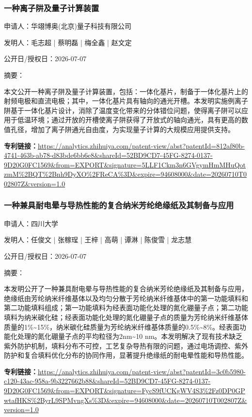 \documentclass[12pt,a4paper]{ctexart}
\begin{document}
\subsubsection{ 一种离子阱及量子计算装置 }

申请人：华翊博奥(北京)量子科技有限公司

发明人：毛志超 | 蔡明磊 | 梅全鑫 | 赵文定

公开日/授权日：2026-07-07

摘要：

本文公开一种离子阱及量子计算装置，包括：一体化基片，制备于一体化基片上的射频电极和直流电极；其中，一体化基片具有轴向的通光开槽。本发明实施例离子阱基于一体化基片设计，消除了温度变化带来的分体错位问题，使得离子阱可以应用于低温环境；通过开放的开槽使离子阱获得了开放式的轴向通光，具有更高的数值孔径，增加了离子阱通光自由度，为实现量子计算的大规模应用提供支持。

\noindent\textbf{专利链接：}\url{https://analytics.zhihuiya.com/patent-view/abst?patentId=812af80b-4741-463b-ab78-d83bde6bb6e8&shareId=52BD9CD7-45FG-8274-0137-9D20G0FC1569&from=EXPORT&signature=5LLF1Ckm3n6GVgymHmMHuQotzmM%2BQT%2Bnh9DyXO%2FReCA%3D&expire=94608000&date=20260710T002807Z&version=1.0}

\subsubsection{ 一种兼具耐电晕与导热性能的复合纳米芳纶绝缘纸及其制备与应用 }

申请人：四川大学

发明人：任俊文 | 张稼珵 | 王梓 | 高萌 | 谭淋 | 陈俊雪 | 龙志慧

公开日/授权日：2026-07-07

摘要：

本发明公开了一种兼具耐电晕与导热性能的复合纳米芳纶绝缘纸及其制备与应用，绝缘纸由芳纶纳米纤维基体以及均匀分散于芳纶纳米纤维基体中的第一功能填料和第二功能填料组成；第一功能填料为经表面功能化处理的氮化硼量子点；第二功能填料为纳米碳化硅；经表面功能化处理的氮化硼量子点的质量为芳纶纳米纤维基体质量的1\%\textasciitilde{}15\%，纳米碳化硅质量为芳纶纳米纤维基体质量的0.5\%\textasciitilde{}8\%。经表面功能化处理的氮化硼量子点的平均粒径为2nm\textasciitilde{}10 nm。本发明解决了现有技术缺乏紫外防护机制，填料分布不可控，工艺复杂导热有限的问题，通过电场调控、紫外防护和复合填料优化分布的协同作用，显著提升绝缘纸的耐电晕性能和导热性能。

\noindent\textbf{专利链接：}\url{https://analytics.zhihuiya.com/patent-view/abst?patentId=3c0b5980-c120-43ac-958a-9b3227662b88&shareId=52BD9CD7-45FG-8274-0137-9D20G0FC1569&from=EXPORT&signature=FycS9fUCKgWV4S3%2Fz0DP0GPwtafHKS%2ByrL9SPMvngXs%3D&expire=94608000&date=20260710T002807Z&version=1.0}
\end{document}
